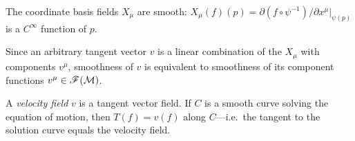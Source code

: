 \begin{lemma}\label{lem:coord-basis-smooth}
  The coordinate basis fields $X_\mu$ are smooth:
  $X_\mu(f)(p) = \partial(f\circ\psi^{-1})/\partial x^\mu|_{\psi(p)}$
  is a $C^\infty$ function of $p$.
\end{lemma}

Since an arbitrary tangent vector $v$ is a linear combination of the
$X_\mu$ with components $v^\mu$, smoothness of $v$ is equivalent
to smoothness of its component functions
$v^\mu\in\mathscr{F}(\mathcal{M})$.

\begin{intuition}
  A \emph{velocity field} $v$ is a tangent vector field.  If $C$ is
  a smooth curve solving the equation of motion, then
  $T(f) = v(f)$ along $C$---i.e.\ the tangent to the solution curve
  equals the velocity field.
\end{intuition}
